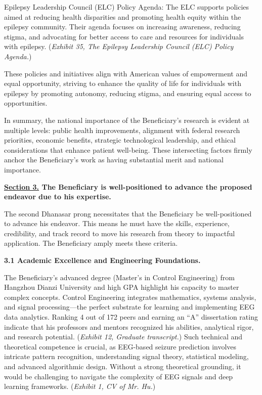 \documentclass{article}
\begin{document}
Epilepsy Leadership Council (ELC) Policy Agenda: The ELC supports policies aimed at reducing health disparities and promoting health equity within the epilepsy community. Their agenda focuses on increasing awareness, reducing stigma, and advocating for better access to care and resources for individuals with epilepsy. ({\it Exhibit 35, The Epilepsy Leadership Council (ELC) Policy Agenda.})

These policies and initiatives align with American values of empowerment and equal opportunity, striving to enhance the quality of life for individuals with epilepsy by promoting autonomy, reducing stigma, and ensuring equal access to opportunities.

In summary, the national importance of the Beneficiary’s research is evident at multiple levels: public health improvements, alignment with federal research priorities, economic benefits, strategic technological leadership, and ethical considerations that enhance patient well-being. These intersecting factors firmly anchor the Beneficiary’s work as having substantial merit and national importance.


\clearpage

{\bf \underline{Section 3.} The Beneficiary is well-positioned to advance the proposed endeavor due to his expertise. }

The second Dhanasar prong necessitates that the Beneficiary be well-positioned to advance his endeavor. This means he must have the skills, experience, credibility, and track record to move his research from theory to impactful application. The Beneficiary amply meets these criteria.


{\bf 3.1 Academic Excellence and Engineering Foundations.}

The Beneficiary’s advanced degree (Master’s in Control Engineering) from Hangzhou Dianzi University and high GPA highlight his capacity to master complex concepts. Control Engineering integrates mathematics, systems analysis, and signal processing—the perfect substrate for learning and implementing EEG data analytics. Ranking 4 out of 172 peers and earning an “A” dissertation rating indicate that his professors and mentors recognized his abilities, analytical rigor, and research potential. ({\it Exhibit 12, Graduate transcript.})
Such technical and theoretical competence is crucial, as EEG-based seizure prediction involves intricate pattern recognition, understanding signal theory, statistical modeling, and advanced algorithmic design. Without a strong theoretical grounding, it would be challenging to navigate the complexity of EEG signals and deep learning frameworks. ({\it Exhibit 1, CV of Mr. Hu.}) 
\end{document}
